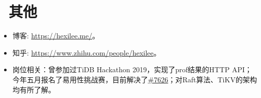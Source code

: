 \documentclass{resume}
\begin{document}
\section{\texorpdfstring{\faInfo}{}\ 其他}
\begin{itemize}[parsep=0.25ex]
  \item 博客: \url{https://hexilee.me/}。
  \item 知乎: \url{https://www.zhihu.com/people/hexilee}。
  \item 岗位相关：曾参加过TiDB Hackathon 2019，实现了prof结果的HTTP API；今年五月报名了易用性挑战赛，目前解决了\href{https://github.com/tikv/tikv/issues/7626}{\#7626}；对Raft算法、TiKV的架构均有所了解。
\end{itemize}
\end{document}
